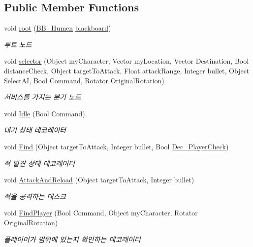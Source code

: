 \subsection*{Public Member Functions}
\begin{DoxyCompactItemize}
\item 
void \hyperlink{class_b_t___base_a54881cf55e411fdbf6c9f98586049742}{root} (\hyperlink{class_b_b___humen}{B\+B\+\_\+\+Humen} \hyperlink{class_b_t___base_a8a095b67df2778f5155d24dad9f818ef}{blackboard})
\begin{DoxyCompactList}\small\item\em 루트 노드 \end{DoxyCompactList}\item 
void \hyperlink{class_b_t___base_adbbf3731340b4e525a1ea549fd6409f3}{selector} (Object my\+Character, Vector my\+Location, Vector Destination, Bool distance\+Check, Object target\+To\+Attack, Float attack\+Range, Integer bullet, Object Select\+AI, Bool Command, Rotator Original\+Rotation)
\begin{DoxyCompactList}\small\item\em 서비스를 가지는 분기 노드 \end{DoxyCompactList}\item 
void \hyperlink{class_b_t___base_a68cb1b35bc3105c36e0bd4b8477a1ec9}{Idle} (Bool Command)
\begin{DoxyCompactList}\small\item\em 대기 상태 데코레이터 \end{DoxyCompactList}\item 
void \hyperlink{class_b_t___base_affb0d6cdaec417994ce78c7608e5bf9e}{Find} (Object target\+To\+Attack, Integer bullet, Bool \hyperlink{class_dec___player_check}{Dec\+\_\+\+Player\+Check})
\begin{DoxyCompactList}\small\item\em 적 발견 상태 데코레이터 \end{DoxyCompactList}\item 
void \hyperlink{class_b_t___base_a4473d81f72741d7b1b4956feada36a28}{Attack\+And\+Reload} (Object target\+To\+Attack, Integer bullet)
\begin{DoxyCompactList}\small\item\em 적을 공격하는 태스크 \end{DoxyCompactList}\item 
void \hyperlink{class_b_t___base_a185c89f6b41c5946e6dac9489f251c0f}{Find\+Player} (Bool Command, Object my\+Character, Rotator Original\+Rotation)
\begin{DoxyCompactList}\small\item\em 플레이어가 범위에 있는지 확인하는 데코레이터 \end{DoxyCompactList}\item 

\end{DoxyCompactItemize}

